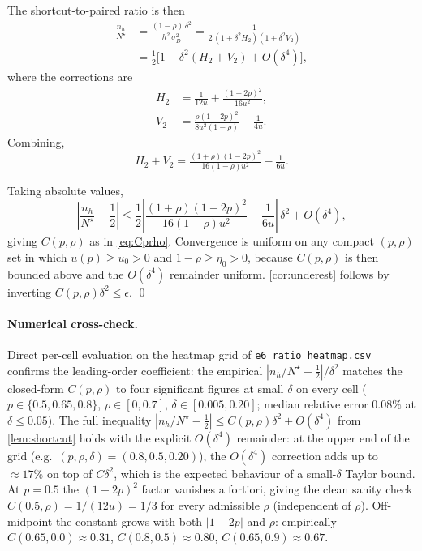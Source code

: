 \documentclass{article}
\theoremstyle{plain}
\theoremstyle{definition}
\begin{document}
The shortcut-to-paired ratio is then
\begin{align}
\frac{n_h}{N^{\star}} &= \frac{(1{-}\rho)\,\delta^2}{h^2\,\sigma_D^2}
= \frac{1}{2\,(1 + \delta^2 H_2)(1 + \delta^2 V_2)} \nonumber\\
&= \tfrac{1}{2}\bigl[1 - \delta^2(H_2 + V_2) + O(\delta^4)\bigr],
\end{align}
where the corrections are
\begin{align}
H_2 &= \tfrac{1}{12u} + \tfrac{(1{-}2p)^2}{16u^2},\\
V_2 &= \tfrac{\rho(1{-}2p)^2}{8u^2(1{-}\rho)} - \tfrac{1}{4u}.
\end{align}
Combining,
\begin{equation}
H_2 + V_2 = \tfrac{(1{+}\rho)(1{-}2p)^2}{16(1{-}\rho)u^2} - \tfrac{1}{6u}.
\end{equation}

Taking absolute values,
\begin{equation}
\left|\frac{n_h}{N^{\star}} - \frac{1}{2}\right| \leq \frac{1}{2}\!\left|\frac{(1{+}\rho)(1{-}2p)^2}{16(1{-}\rho)u^2} - \frac{1}{6u}\right|\,\delta^2 + O(\delta^4),
\end{equation}
giving $C(p,\rho)$ as in \cref{eq:Cprho}. Convergence is uniform on any compact $(p,\rho)$ set in which $u(p)\ge u_0>0$ and $1-\rho \ge \eta_0 > 0$, because $C(p,\rho)$ is then bounded above and the $O(\delta^4)$ remainder uniform. \cref{cor:underest} follows by inverting $C(p,\rho)\delta^2 \le \epsilon$. \qed

\paragraph{Numerical cross-check.} Direct per-cell evaluation on the heatmap grid of \texttt{e6\_ratio\_heatmap.csv} confirms the leading-order coefficient: the empirical $|n_h/N^{\star} - \tfrac12|/\delta^2$ matches the closed-form $C(p,\rho)$ to four significant figures at small $\delta$ on every cell ($p \in \{0.5, 0.65, 0.8\}$, $\rho \in [0, 0.7]$, $\delta \in [0.005, 0.20]$; median relative error $0.08\%$ at $\delta \le 0.05$). The full inequality $|n_h/N^{\star} - \tfrac12| \le C(p,\rho)\delta^2 + O(\delta^4)$ from \cref{lem:shortcut} holds with the explicit $O(\delta^4)$ remainder: at the upper end of the grid (e.g.\ $(p,\rho,\delta) = (0.8, 0.5, 0.20)$), the $O(\delta^4)$ correction adds up to ${\approx}17\%$ on top of $C\delta^2$, which is the expected behaviour of a small-$\delta$ Taylor bound. At $p=0.5$ the $(1{-}2p)^2$ factor vanishes a fortiori, giving the clean sanity check $C(0.5,\rho) = 1/(12u) = 1/3$ for every admissible $\rho$ (independent of $\rho$). Off-midpoint the constant grows with both $|1{-}2p|$ and $\rho$: empirically $C(0.65, 0.0) \approx 0.31$, $C(0.8, 0.5) \approx 0.80$, $C(0.65, 0.9) \approx 0.67$.
\end{document}
